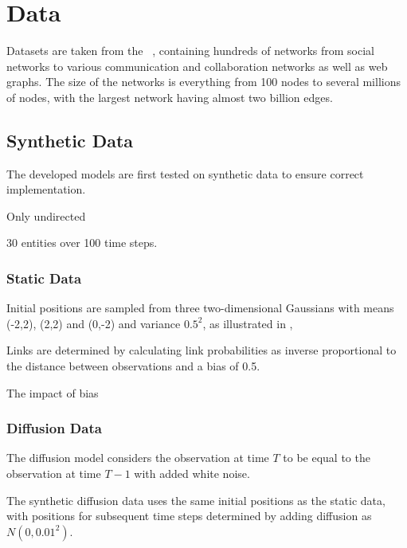 \chapter{Data}\label{ch:Data}

Datasets are taken from the ~\cite{snapnets}, containing hundreds of networks from social networks to various communication and collaboration networks as well as web graphs. The size of the networks is everything from 100 nodes to several millions of nodes, with the largest network having almost two billion edges.


\section{Synthetic Data}

    The developed models are first tested on synthetic data to ensure correct implementation. 
    
    Only undirected
    
    30 entities over 100 time steps.
    
    \subsection{Static Data}
    
        Initial positions are sampled from three two-dimensional Gaussians with means (-2,2), (2,2) and (0,-2) and variance $0.5^2$, as illustrated in ,

                
        Links are determined by calculating link probabilities as inverse proportional to the distance between observations and a bias of 0.5.
        
        The impact of bias
        
    
    \subsection{Diffusion Data}
    
        The diffusion model considers the observation at time $T$ to be equal to the observation at time $T-1$ with added white noise.
    
        The synthetic diffusion data uses the same initial positions as the static data, with positions for subsequent time steps determined by adding diffusion as $N(0,0.01^2)$. 
        

